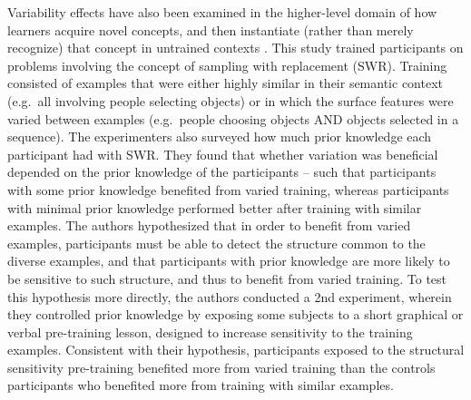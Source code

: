 \documentclass[
  12pt,
  letterpaper,
]{article}
\begin{document}
Variability effects have also been examined in the higher-level domain
of how learners acquire novel concepts, and then instantiate (rather
than merely recognize) that concept in untrained contexts
\autocite{braithwaiteEffectsVariationPrior2015}. This study trained
participants on problems involving the concept of sampling with
replacement (SWR). Training consisted of examples that were either
highly similar in their semantic context (e.g.~all involving people
selecting objects) or in which the surface features were varied between
examples (e.g.~people choosing objects AND objects selected in a
sequence). The experimenters also surveyed how much prior knowledge each
participant had with SWR. They found that whether variation was
beneficial depended on the prior knowledge of the participants -- such
that participants with some prior knowledge benefited from varied
training, whereas participants with minimal prior knowledge performed
better after training with similar examples. The authors hypothesized
that in order to benefit from varied examples, participants must be able
to detect the structure common to the diverse examples, and that
participants with prior knowledge are more likely to be sensitive to
such structure, and thus to benefit from varied training. To test this
hypothesis more directly, the authors conducted a 2nd experiment,
wherein they controlled prior knowledge by exposing some subjects to a
short graphical or verbal pre-training lesson, designed to increase
sensitivity to the training examples. Consistent with their hypothesis,
participants exposed to the structural sensitivity pre-training
benefited more from varied training than the controls participants who
benefited more from training with similar examples.
\end{document}
